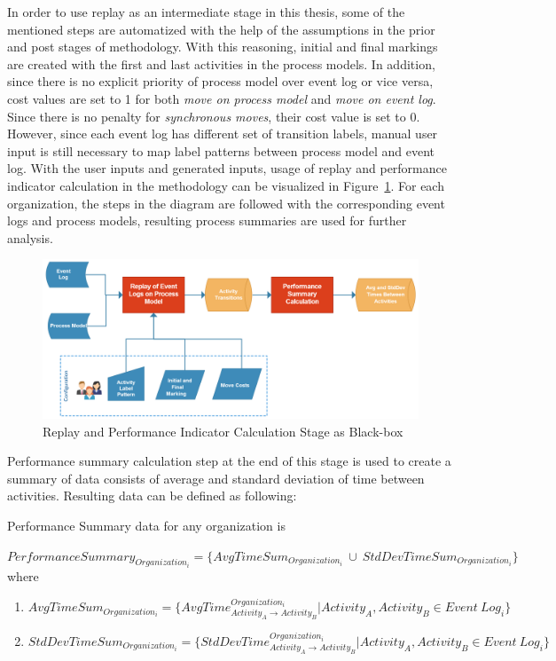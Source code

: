 In order to use replay as an intermediate stage in this thesis, some of the mentioned steps are automatized with the help of the assumptions in the prior and post stages of methodology. With this reasoning, initial and final markings are created with the first and last activities in the process models. In addition, since there is no explicit priority of process model over event log or vice versa, cost values are set to 1 for both \textit{move on process model} and \textit{move on event log}. Since there is no penalty for \textit{synchronous moves}, their cost value is set to 0. However, since each event log has different set of transition labels, manual user input is still necessary to map label patterns between process model and event log. With the user inputs and generated inputs, usage of replay and performance indicator calculation in the methodology can be visualized in Figure~\ref{fig:replay-and-performance-indicator-calculation}. For each organization, the steps in the diagram are followed with the corresponding event logs and process models, resulting process summaries are used for further analysis.

\begin{figure}
  \centering
  \includegraphics[width=\textwidth]{4_methodology/replay-and-performance-indicator-calculation}
  \caption{Replay and Performance Indicator Calculation Stage as Black-box}
  \label{fig:replay-and-performance-indicator-calculation}
\end{figure}

Performance summary calculation step at the end of this stage is used to create a summary of data consists of average and standard deviation of time between activities. Resulting data can be defined as following:
	\theoremstyle{definition}
	\begin{definition}{} Performance Summary data for any organization is 

	$PerformanceSummary_{Organization_{i}}= \{AvgTimeSum_{Organization_{i}}\ \cup\ StdDevTimeSum_{Organization_{i}}\}$ where
		\begin{enumerate}
			\item $AvgTimeSum_{Organization_{i}} = \{ AvgTime_{Activity_{A}\rightarrow Activity_{B}}^{Organization_{i}} | Activity_{A},Activity_{B}  \in Event\ Log_{i}\}$
			\item $StdDevTimeSum_{Organization_{i}} = \{ StdDevTime_{Activity_{A}\rightarrow Activity_{B}}^{Organization_{i}} | Activity_{A},Activity_{B}  \in Event\ Log_{i}\}$
		\end{enumerate}
	\end{definition}


